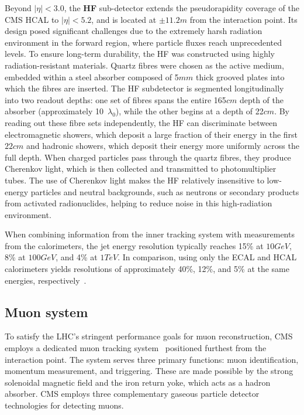 Beyond $|\eta| < 3.0$, the \textbf{HF} sub-detector extends the pseudorapidity coverage of the CMS HCAL to $|\eta| < 5.2$, and is located at $\pm 11.2\unit{m}$ from the interaction point. Its design posed significant challenges due to the extremely harsh radiation environment in the forward region, where particle fluxes reach unprecedented levels. To ensure long-term durability, the HF was constructed using highly radiation-resistant materials. Quartz fibres were chosen as the active medium, embedded within a steel absorber composed of 5$\unit{mm}$ thick grooved plates into which the fibres are inserted. The HF subdetector is segmented longitudinally into two readout depths: one set of fibres spans the entire 165$\unit{cm}$ depth of the absorber (approximately 10~$\lambda_0$), while the other begins at a depth of 22$\unit{cm}$. By reading out these fibre sets independently, the HF can discriminate between electromagnetic showers, which deposit a large fraction of their energy in the first $22\unit{cm}$ and hadronic showers, which deposit their energy more uniformly across the full depth. When charged particles pass through the quartz fibres, they produce Cherenkov light, which is then collected and transmitted to photomultiplier tubes. The use of Cherenkov light makes the HF relatively insensitive to low-energy particles and neutral backgrounds, such as neutrons or secondary products from activated radionuclides, helping to reduce noise in this high-radiation environment.

When combining information from the inner tracking system with measurements from the calorimeters, the jet energy resolution typically reaches 15\% at $10\unit{GeV}$, 8\% at $100\unit{GeV}$, and 4\% at $1\unit{TeV}$. In comparison, using only the ECAL and HCAL calorimeters yields resolutions of approximately 40\%, 12\%, and 5\% at the same energies, respectively~\cite{CMS_HCAL_EnergyResolution}.

\subsection{Muon system}
To satisfy the LHC’s stringent performance goals for muon reconstruction, CMS employs a dedicated muon tracking system~\cite{LHC_CMS,CMS_Muon_System_Performance} positioned furthest from the interaction point. The system serves three primary functions: muon identification, momentum measurement, and triggering. These are made possible by the strong solenoidal magnetic field and the iron return yoke, which acts as a hadron absorber.  CMS employs three complementary gaseous particle detector technologies for detecting muons.  


